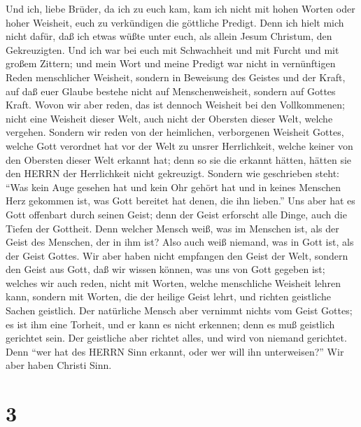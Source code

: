  Und ich, liebe Brüder, da ich zu euch kam, kam ich nicht
mit hohen Worten oder hoher Weisheit, euch zu verkündigen die göttliche
Predigt.  Denn ich hielt mich nicht dafür, daß ich etwas
wüßte unter euch, als allein Jesum Christum, den Gekreuzigten.
 Und ich war bei euch mit Schwachheit und mit Furcht und mit
großem Zittern;  und mein Wort und meine Predigt war nicht
in vernünftigen Reden menschlicher Weisheit, sondern in Beweisung des
Geistes und der Kraft,  auf daß euer Glaube bestehe nicht
auf Menschenweisheit, sondern auf Gottes Kraft.  Wovon wir
aber reden, das ist dennoch Weisheit bei den Vollkommenen; nicht eine
Weisheit dieser Welt, auch nicht der Obersten dieser Welt, welche
vergehen.  Sondern wir reden von der heimlichen, verborgenen
Weisheit Gottes, welche Gott verordnet hat vor der Welt zu unsrer
Herrlichkeit,  welche keiner von den Obersten dieser Welt
erkannt hat; denn so sie die erkannt hätten, hätten sie den HERRN der
Herrlichkeit nicht gekreuzigt.  Sondern wie geschrieben
steht: ``Was kein Auge gesehen hat und kein Ohr gehört hat und in keines
Menschen Herz gekommen ist, was Gott bereitet hat denen, die ihn
lieben.''  Uns aber hat es Gott offenbart durch seinen
Geist; denn der Geist erforscht alle Dinge, auch die Tiefen der
Gottheit.  Denn welcher Mensch weiß, was im Menschen ist,
als der Geist des Menschen, der in ihm ist? Also auch weiß niemand, was
in Gott ist, als der Geist Gottes.  Wir aber haben nicht
empfangen den Geist der Welt, sondern den Geist aus Gott, daß wir wissen
können, was uns von Gott gegeben ist;  welches wir auch
reden, nicht mit Worten, welche menschliche Weisheit lehren kann,
sondern mit Worten, die der heilige Geist lehrt, und richten geistliche
Sachen geistlich.  Der natürliche Mensch aber vernimmt
nichts vom Geist Gottes; es ist ihm eine Torheit, und er kann es nicht
erkennen; denn es muß geistlich gerichtet sein.  Der
geistliche aber richtet alles, und wird von niemand gerichtet.
 Denn ``wer hat des HERRN Sinn erkannt, oder wer will ihn
unterweisen?'' Wir aber haben Christi Sinn.

\hypertarget{section-2}{%
\section{3}\label{section-2}}

